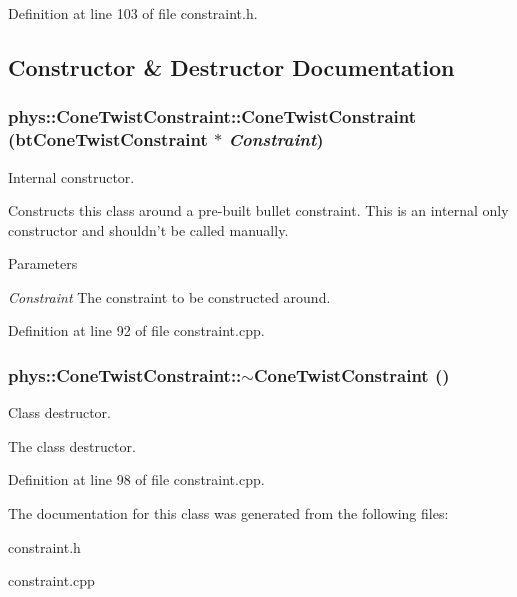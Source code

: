 Definition at line 103 of file constraint.h.



\subsection{Constructor \& Destructor Documentation}
\hypertarget{classphys_1_1ConeTwistConstraint_a38a9a0e7676d8ad8f77831a319bc007b}{
\subsubsection[{ConeTwistConstraint}]{\setlength{\rightskip}{0pt plus 5cm}phys::ConeTwistConstraint::ConeTwistConstraint (btConeTwistConstraint $\ast$ {\em Constraint})}}
\label{da/dbc/classphys_1_1ConeTwistConstraint_a38a9a0e7676d8ad8f77831a319bc007b}


Internal constructor. 

Constructs this class around a pre-\/built bullet constraint. This is an internal only constructor and shouldn't be called manually. 
\begin{DoxyParams}{Parameters}
\item[{\em Constraint}]The constraint to be constructed around. \end{DoxyParams}


Definition at line 92 of file constraint.cpp.

\hypertarget{classphys_1_1ConeTwistConstraint_aae5d4aeeff871a2ec79bdb7d493588df}{
\subsubsection[{$\sim$ConeTwistConstraint}]{\setlength{\rightskip}{0pt plus 5cm}phys::ConeTwistConstraint::$\sim$ConeTwistConstraint ()}}
\label{da/dbc/classphys_1_1ConeTwistConstraint_aae5d4aeeff871a2ec79bdb7d493588df}


Class destructor. 

The class destructor. 

Definition at line 98 of file constraint.cpp.



The documentation for this class was generated from the following files:\begin{DoxyCompactItemize}
\item 
constraint.h\item 
constraint.cpp\end{DoxyCompactItemize}
